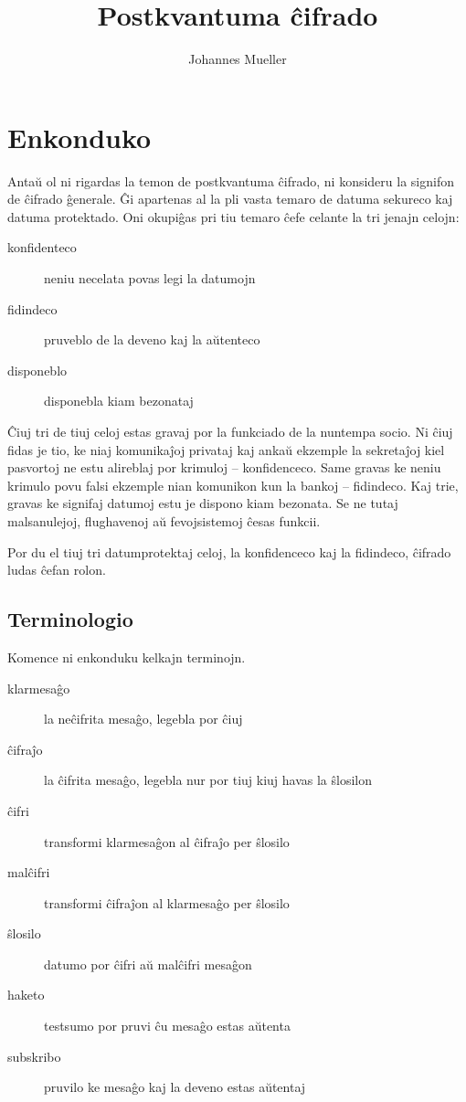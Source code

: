 \documentclass[utf8]{scrartcl}
\title{Postkvantuma ĉifrado}
\author{Johannes Mueller}
\begin{document}
\section{Enkonduko}

Antaŭ ol ni rigardas la temon de postkvantuma ĉifrado, ni konsideru la signifon
de ĉifrado ĝenerale.  Ĝi apartenas al la pli vasta temaro de datuma sekureco
kaj datuma protektado.  Oni okupiĝas pri tiu temaro ĉefe celante la tri jenajn
celojn:
%
\begin{description}
\item[konfidenteco] neniu necelata povas legi la datumojn
\item[fidindeco] pruveblo de la deveno kaj la aŭtenteco
\item[disponeblo] disponebla kiam bezonataj
\end{description}

Ĉiuj tri de tiuj celoj estas gravaj por la funkciado de la nuntempa socio.  Ni
ĉiuj fidas je tio, ke niaj komunikaĵoj privataj kaj ankaŭ ekzemple la
sekretaĵoj kiel pasvortoj ne estu alireblaj por krimuloj – konfidenceco. Same
gravas ke neniu krimulo povu falsi ekzemple nian komunikon kun la bankoj –
fidindeco.  Kaj trie, gravas ke signifaj datumoj estu je dispono kiam
bezonata. Se ne tutaj malsanulejoj, flughavenoj aŭ fevojsistemoj ĉesas funkcii.

Por du el tiuj tri datumprotektaj celoj, la konfidenceco kaj la fidindeco,
ĉifrado ludas ĉefan rolon.

\subsection{Terminologio}

Komence ni enkonduku kelkajn terminojn.
%
\begin{description}
\item[klarmesaĝo] la neĉifrita mesaĝo, legebla por ĉiuj
\item[ĉifraĵo] la ĉifrita mesaĝo, legebla nur por tiuj kiuj havas la ŝlosilon
\item[ĉifri] transformi klarmesaĝon al ĉifraĵo per ŝlosilo
\item[malĉifri] transformi ĉifraĵon al klarmesaĝo per ŝlosilo
\item[ŝlosilo] datumo por ĉifri aŭ malĉifri mesaĝon
\item[haketo] testsumo por pruvi ĉu mesaĝo estas aŭtenta
\item[subskribo] pruvilo ke mesaĝo kaj la deveno estas aŭtentaj
\end{description}
\end{document}
